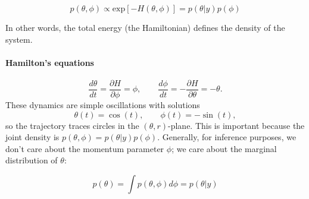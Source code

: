 \begin{equation}
    p(\theta,\phi) \propto \text{exp}[-H\left(\theta,\phi\right)] = p(\theta|y)p(\phi)
\end{equation}

In other words, the total energy (the Hamiltonian) defines the density of the system.  

\paragraph{Hamilton’s equations}
\[
\frac{d\theta}{dt} = \frac{\partial H}{\partial \phi} = \phi,
\qquad
\frac{d\phi}{dt} = -\frac{\partial H}{\partial \theta} = -\theta.
\]
These dynamics are simple oscillations with solutions
\[
\theta(t) = \cos(t), \qquad \phi(t) = -\sin(t),
\]
so the trajectory traces circles in the $(\theta,r)$-plane.  
This is important because the joint density is \(p(\theta,\phi) = p(\theta|y)p(\phi)\).  
Generally, for inference purposes, we don't care about the momentum parameter \(\phi\); 
we care about the marginal distribution of \(\theta\):

\begin{equation}
    p(\theta) = \int p(\theta,\phi)d\phi = p(\theta|y)
\end{equation}